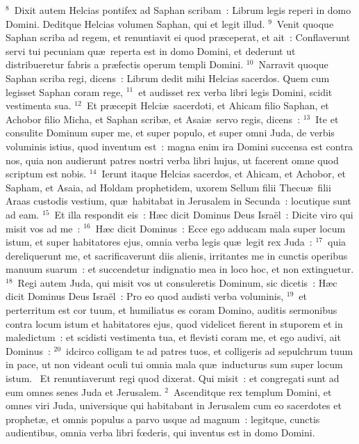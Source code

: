 ${}^{8}$~Dixit autem Helcias pontifex ad Saphan scribam~: Librum legis reperi in domo Domini. Deditque Helcias volumen Saphan, qui et legit illud.
${}^{9}$~Venit quoque Saphan scriba ad regem, et renuntiavit ei quod pr\ae ceperat, et ait~: Conflaverunt servi tui pecuniam qu\ae\ reperta est in domo Domini, et dederunt ut distribueretur fabris a pr\ae fectis operum templi Domini.
${}^{10}$~Narravit quoque Saphan scriba regi, dicens~: Librum dedit mihi Helcias sacerdos. Quem cum legisset Saphan coram rege,
${}^{11}$~et audisset rex verba libri legis Domini, scidit vestimenta sua.
${}^{12}$~Et pr\ae cepit Helci\ae\ sacerdoti, et Ahicam filio Saphan, et Achobor filio Micha, et Saphan scrib\ae , et Asai\ae\ servo regis, dicens~:
${}^{13}$~Ite et consulite Dominum super me, et super populo, et super omni Juda, de verbis voluminis istius, quod inventum est~: magna enim ira Domini succensa est contra nos, quia non audierunt patres nostri verba libri hujus, ut facerent omne quod scriptum est nobis.
${}^{14}$~Ierunt itaque Helcias sacerdos, et Ahicam, et Achobor, et Sapham, et Asaia, ad Holdam prophetidem, uxorem Sellum filii Thecu\ae\ filii Araas custodis vestium, qu\ae\ habitabat in Jerusalem in Secunda~: locutique sunt ad eam.
${}^{15}$~Et illa respondit eis~: H\ae c dicit Dominus Deus Isra\"el~: Dicite viro qui misit vos ad me~:
${}^{16}$~H\ae c dicit Dominus~: Ecce ego adducam mala super locum istum, et super habitatores ejus, omnia verba legis qu\ae\ legit rex Juda~:
${}^{17}$~quia dereliquerunt me, et sacrificaverunt diis alienis, irritantes me in cunctis operibus manuum suarum~: et succendetur indignatio mea in loco hoc, et non extinguetur.
${}^{18}$~Regi autem Juda, qui misit vos ut consuleretis Dominum, sic dicetis~: H\ae c dicit Dominus Deus Isra\"el~: Pro eo quod audisti verba voluminis,
${}^{19}$~et perterritum est cor tuum, et humiliatus es coram Domino, auditis sermonibus contra locum istum et habitatores ejus, quod videlicet fierent in stuporem et in maledictum~: et scidisti vestimenta tua, et flevisti coram me, et ego audivi, ait Dominus~:
${}^{20}$~idcirco colligam te ad patres tuos, et colligeris ad sepulchrum tuum in pace, ut non videant oculi tui omnia mala qu\ae\ inducturus sum super locum istum.
~\lettrine[lines=10,image=true,loversize=0.05,lraise=-0.03]{E}{}t renuntiaverunt regi quod dixerat. Qui misit~: et congregati sunt ad eum omnes senes Juda et Jerusalem.
${}^{2}$~Ascenditque rex templum Domini, et omnes viri Juda, universique qui habitabant in Jerusalem cum eo sacerdotes et prophet\ae , et omnis populus a parvo usque ad magnum~: legitque, cunctis audientibus, omnia verba libri fœderis, qui inventus est in domo Domini.
